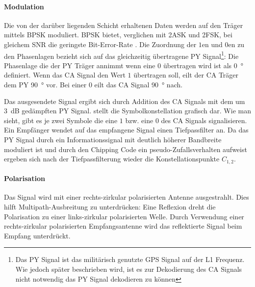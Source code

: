 \paragraph{Modulation}
Die von der darüber liegenden Schicht erhaltenen Daten werden auf den Träger mittels \gls{BPSK} moduliert. \gls{BPSK} bietet, verglichen mit 2ASK und 2FSK, bei gleichem \gls{SNR} die geringste Bit-Error-Rate \cite{dixon1998radio}. Die Zuordnung der $1$en und $0$en zu den Phasenlagen bezieht sich auf das gleichzeitig übertragene \gls{PY} Signal\footnote{Das \gls{PY} Signal ist das militärisch genutzte GPS Signal auf der L1 Frequenz. Wie jedoch später beschrieben wird, ist es zur Dekodierung des \gls{CA} Signals nicht notwendig das \gls{PY} Signal dekodieren zu können}: Die Phasenlage die der \gls{PY} Träger annimmt wenn eine $0$ übertragen wird ist als \SI{0}{\degree} definiert. Wenn das \gls{CA} Signal den Wert $1$ übertragen soll, eilt der \gls{CA} Träger dem \gls{PY} \SI{90}{\degree} vor. Bei einer $0$ eilt das CA Signal \SI{90}{\degree} nach.

Das ausgesendete Signal ergibt sich durch Addition des \gls{CA} Signals mit dem um \SI{3}{\dB} gedämpften \gls{PY} Signal.  stellt die Symbolkonstellation grafisch dar. Wie man sieht, gibt es je zwei Symbole die eine $1$ bzw. eine $0$ des \gls{CA} Signals signalisieren. Ein Empfänger wendet auf das empfangene Signal einen Tiefpassfilter an. Da das \gls{PY} Signal durch ein Informationssignal mit deutlich höherer Bandbreite moduliert ist und durch den Chipping Code ein pseudo-Zu\-falls\-ver\-hal\-ten aufweist ergeben sich nach der Tiefpassfilterung wieder die Konstellationspunkte $C_{1,2}$.


\paragraph{Polarisation} Das Signal wird mit einer rechts-zirkular polarisierten Antenne ausgestrahlt. Dies hilft Multipath-Ausbreitung zu unterdrücken: Eine Reflexion dreht die Polarisation zu einer links-zirkular polarisierten Welle. Durch Verwendung einer rechts-zirkular polarisierten Empfangsantenne wird das reflektierte Signal beim Empfang unterdrückt.

